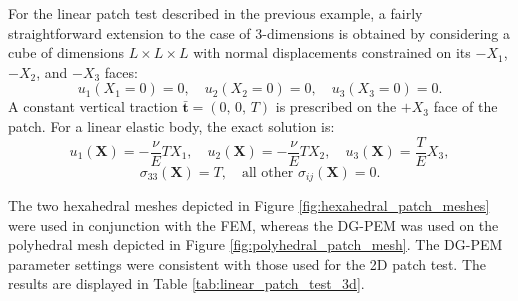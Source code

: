 For the linear patch test described in the previous example, a fairly straightforward extension to the case of 3-dimensions is obtained by considering a cube of dimensions $L \times L \times L$ with normal displacements constrained on its $-X_1$, $-X_2$, and $-X_3$ faces:
\begin{equation}
	u_1 (X_1 = 0) = 0, \quad u_2 (X_2 = 0) = 0, \quad u_3 (X_3 = 0) = 0.
\end{equation}
A constant vertical traction $\bar{\bm{t}} = (0, \, 0, \, T)$ is prescribed on the $+X_3$ face of the patch. For a linear elastic body, the exact solution is:
\begin{equation}
	u_1 (\bm{X}) = - \frac{\nu}{E} T X_1, \quad u_2 (\bm{X}) = - \frac{\nu}{E} T X_2, \quad u_3 (\bm{X}) = \frac{T}{E} X_3, 
\end{equation}
\begin{equation}
	\sigma_{33} (\bm{X}) = T, \quad \text{all other } \sigma_{ij} (\bm{X}) = 0.
\end{equation}


The two hexahedral meshes depicted in Figure \ref{fig:hexahedral_patch_meshes} were used in conjunction with the FEM, whereas the DG-PEM was used on the polyhedral mesh depicted in Figure \ref{fig:polyhedral_patch_mesh}. The DG-PEM parameter settings were consistent with those used for the 2D patch test. The results are displayed in Table \ref{tab:linear_patch_test_3d}.

